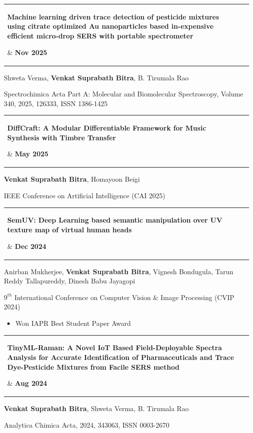 \documentclass[letterpaper,11pt]{article}
\makeatletter
\newcommand{\resumeItem}[1]{
  \item\small{
    {#1 \vspace{-2pt}}
  }
}
\newcommand{\publicationHeading}[2]{
    \item
    \begin{tabular*}{1.001\textwidth}{@{\extracolsep{\fill}} l r}
      \parbox[t]{0.9\textwidth}{\small#1} & \textbf{\small #2}\\
    \end{tabular*}\vspace{-7pt}
}
\newcommand{\resumeItemListStart}{\begin{itemize}}
\newcommand{\resumeItemListEnd}{\end{itemize}\vspace{-5pt}}
\makeatother
\begin{document}
\vspace{-12pt}

\publicationHeading{\textbf{Machine learning driven trace detection of pesticide mixtures using citrate optimized Au nanoparticles based in-expensive efficient micro-drop SERS with portable spectrometer}}{Nov 2025}
\vspace{-4pt}
\resumeItem{Shweta Verma, \textbf{Venkat Suprabath Bitra}, B. Tirumala Rao}
\vspace{-4pt}  
\resumeItem{ Spectrochimica Acta Part A: Molecular and Biomolecular Spectroscopy, Volume 340, 2025, 126333, ISSN 1386-1425 \href{https://doi.org/10.1016/j.saa.2025.126333}{\raisebox{-0.2\height}\faExternalLink}}

\vspace{-12pt}

\publicationHeading{\textbf{DiffCraft: A Modular Differentiable Framework for Music Synthesis with Timbre Transfer}}{May 2025}
\vspace{-12pt}
\resumeItem{\textbf{Venkat Suprabath Bitra}, Homayoon Beigi}
\vspace{-4pt}
\resumeItem{IEEE Conference on Artificial Intelligence (CAI 2025) \href{https://doi.org/10.1109/CAI64502.2025.00124}{\raisebox{-0.2\height}\faExternalLink}}

\vspace{-12pt}


\publicationHeading{\textbf{SemUV: Deep Learning based semantic manipulation over UV texture map of virtual human heads}}{Dec 2024}
\vspace{-12pt}
\resumeItem{Anirban Mukherjee, \textbf{Venkat Suprabath Bitra}, Vignesh Bondugula, Tarun Reddy Tallapureddy, Dinesh Babu Jayagopi}
\vspace{-4pt}
\resumeItem{$9^{th}$  International Conference on Computer Vision \& Image Processing (CVIP 2024) \href{https://doi.org/10.48550/arXiv.2407.00229}{\raisebox{-0.2\height}\faExternalLink}}

\vspace{-6pt}
\resumeItemListStart
\resumeItem{Won IAPR Best Student Paper Award}
\resumeItemListEnd

\vspace{-12pt}


\publicationHeading{\textbf{TinyML-Raman: A Novel IoT Based Field-Deployable Spectra Analysis for Accurate Identification of Pharmaceuticals and Trace Dye-Pesticide Mixtures from Facile SERS method}}{Aug 2024}
\vspace{-4pt}
\resumeItem{\textbf{Venkat Suprabath Bitra}, Shweta Verma, B. Tirumala Rao}
\vspace{-4pt}  
\resumeItem{ Analytica Chimica Acta, 2024, 343063, ISSN 0003-2670 \href{https://doi.org/10.1016/j.aca.2024.343063}{\raisebox{-0.2\height}\faExternalLink}}
\end{document}
